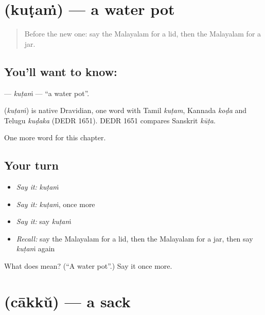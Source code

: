 \section[\texorpdfstring{\ml{കുടം} (kuṭaṁ)}{കുടം (kuṭaṁ)}]{ (kuṭaṁ) — a water pot}

\label{lesson:ML-C330-kutam}



\begin{quote}
Before the new one: say the Malayalam for a lid, then the Malayalam for a jar.
\end{quote}

\subsection*{You'll want to know: }
\textbf{} — \emph{kuṭaṁ} — \textquotedblleft{}a water pot\textquotedblright{}.

\begin{cousinweb}
\textbf{} (\emph{kuṭaṁ}) is native Dravidian, one word with Tamil \emph{kuṭam}, Kannada \emph{koḍa} and Telugu \emph{kuḍaka} (DEDR 1651). DEDR 1651 compares Sanskrit \emph{kūṭa}.
\end{cousinweb}

\begin{grammarlens}[title={What you've built}]
One more word for this chapter.
\end{grammarlens}

\subsection*{Your turn}
\begin{itemize}
\raggedright
  \item \emph{Say it:} \emph{kuṭaṁ}
  \item \emph{Say it:} \emph{kuṭaṁ}, once more
  \item \emph{Say it:} say \emph{kuṭaṁ}
  \item \emph{Recall:} say the Malayalam for a lid, then the Malayalam for a jar, then say \emph{kuṭaṁ} again
\end{itemize}

\begin{tcolorbox}[breakable,colback=teal!4,colframe=teal!35!black,title={Before you move on}]
What does  mean? (\textquotedblleft{}A water pot\textquotedblright{}.) Say it once more.
\end{tcolorbox}
\section[\texorpdfstring{\ml{ചാക്ക്} (cākkŭ)}{ചാക്ക് (cākkŭ)}]{ (cākkŭ) — a sack}

